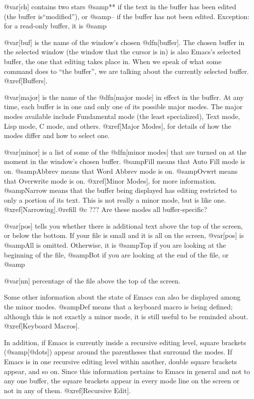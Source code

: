   @var[ch] contains two stars @samp{**} if the text in the buffer has been
edited (the buffer is``modified''), or @samp{--} if the buffer has not been
edited.  Exception: for a read-only buffer, it is @samp{%

  @var[buf] is the name of the window's chosen @dfn[buffer].  The chosen
buffer in the selected window (the window that the cursor is in) is also
Emacs's selected buffer, the one that editing takes place in.  When we
speak of what some command does to ``the buffer'', we are talking about
the currently selected buffer.  @xref[Buffers].

  @var[major] is the name of the @dfn[major mode] in effect in the buffer.
At any time, each buffer is in one and only one of its possible major
modes.  The major modes available include Fundamental mode (the least
specialized), Text mode, Lisp mode, C mode, and others.  @xref[Major
Modes], for details of how the modes differ and how to select one.

  @var[minor] is a list of some of the @dfn[minor modes] that are turned on
at the moment in the window's chosen buffer.  @samp{Fill} means that Auto
Fill mode is on.  @samp{Abbrev} means that Word Abbrev mode is on.
@samp{Ovwrt} means that Overwrite mode is on.  @xref[Minor Modes], for more
information.  @samp{Narrow} means that the buffer being displayed has 
editing restricted to only a portion of its text.  This is not really
a minor mode, but is like one.  @xref[Narrowing].@refill
@c ??? Are these modes all buffer-specific?

  @var[pos] tells you whether there is additional text above the top of the
screen, or below the bottom.  If your file is small and it is all on the
screen, @var[pos] is @samp{All} is omitted.  Otherwise, it is @samp{Top} if
you are looking at the beginning of the file, @samp{Bot} if you are looking
at the end of the file, or @samp{@var[nn]%
percentage of the file above the top of the screen.

  Some other information about the state of Emacs can also be displayed
among the minor modes.  @samp{Def} means that a keyboard macro is being
defined; although this is not exactly a minor mode, it is still useful to
be reminded about.  @xref[Keyboard Macros].

  In addition, if Emacs is currently inside a recursive editing level,
square brackets (@samp{[@dots]}) appear around the parentheses that
surround the modes.  If Emacs is in one recursive editing level within
another, double square brackets appear, and so on.  Since this information
pertains to Emacs in general and not to any one buffer, the square brackets
appear in every mode line on the screen or not in any of them.
@xref[Recursive Edit].

}}
